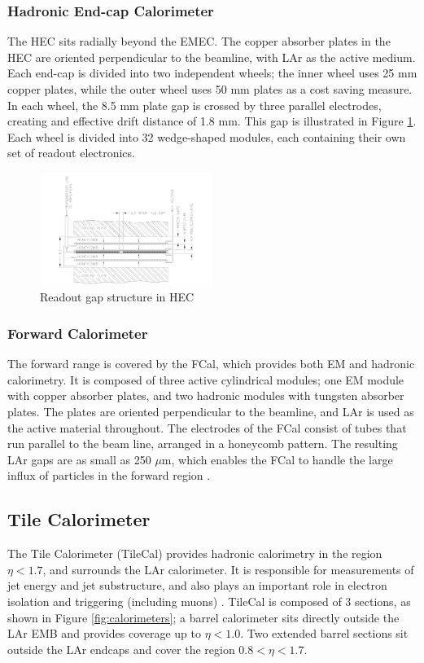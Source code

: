 \subsubsection{Hadronic End-cap Calorimeter}
The HEC sits radially beyond the EMEC. The copper absorber plates in the HEC are oriented perpendicular to the beamline, with LAr as the active medium. Each end-cap is divided into two independent wheels; the inner wheel uses 25 mm copper plates, while the outer wheel uses 50 mm plates as a cost saving measure. In each wheel, the 8.5 mm plate gap is crossed by three parallel electrodes, creating and effective drift distance of 1.8 mm. This gap is illustrated in Figure \ref{fig:hec}. Each wheel is divided into 32 wedge-shaped modules, each containing their own set of readout electronics.\par

\begin{figure}
        \centering
	\includegraphics[width=0.5\textwidth]{figures/ch4/hec.png}
	\caption{Readout gap structure in HEC \cite{lar_tdr}}
	\label{fig:hec}
\end{figure}

\subsubsection{Forward Calorimeter}
The forward range is covered by the FCal, which provides both EM and hadronic calorimetry. It is composed of three active cylindrical modules; one EM module with copper absorber plates, and two hadronic modules with tungsten absorber plates. The plates are oriented perpendicular to the beamline, and LAr is used as the active material throughout. The electrodes of the FCal consist of tubes that run parallel to the beam line, arranged in a honeycomb pattern. The resulting LAr gaps are as small as 250 $\mu$m, which enables the FCal to handle the large influx of particles in the forward region \cite{lar_tdr}. 

\subsection{Tile Calorimeter}
The Tile Calorimeter (TileCal) provides hadronic calorimetry in the region $\eta < 1.7$, and surrounds the LAr calorimeter. It is responsible for measurements of jet energy and jet substructure, and also plays an important role in electron isolation and triggering (including muons) \cite{tile_tdr}. TileCal is composed of 3 sections, as shown in Figure \ref{fig:calorimeters}; a barrel calorimeter sits directly outside the LAr EMB and provides coverage up to $\eta < 1.0$. Two extended barrel sections sit outside the LAr endcaps and cover the region $0.8 < \eta < 1.7$. \par

